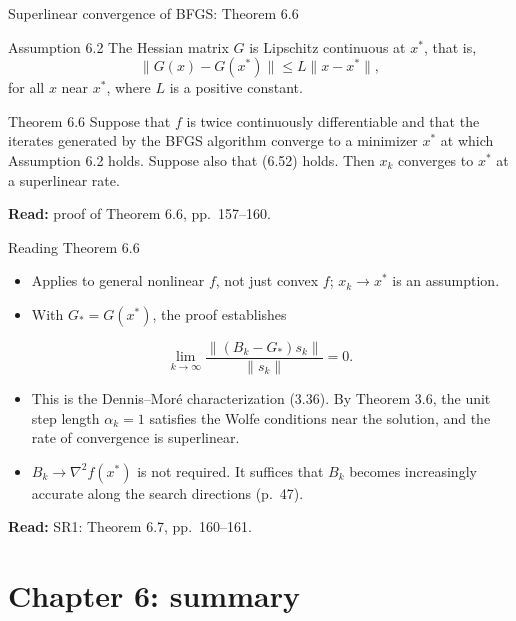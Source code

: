 \documentclass[aspectratio=169,12pt]{beamer}
\newcommand{\xs}{x^{*}}
\newcommand{\hessf}{\nabla^{2} f}
\newcommand{\readbook}[1]{{\color{red}\textbf{Read:} #1}}
\begin{document}
\begin{frame}{Superlinear convergence of BFGS: Theorem 6.6}
  \begin{block}{Assumption 6.2}
    The Hessian matrix $G$ is Lipschitz continuous at $\xs$, that is,
    \[ \|G(x)-G(\xs)\|\le L\|x-\xs\| , \]
    for all $x$ near $\xs$, where $L$ is a positive constant.
  \end{block}

  \begin{block}{Theorem 6.6}
    Suppose that $f$ is twice continuously differentiable and that the iterates generated by
    the BFGS algorithm converge to a minimizer $\xs$ at which Assumption 6.2 holds. Suppose
    also that (6.52) holds. Then $x_{k}$ converges to $\xs$ at a superlinear rate.
  \end{block}

  \readbook{proof of Theorem 6.6, pp.~157--160.}
\end{frame}

\begin{frame}{Reading Theorem 6.6}
  \begin{itemize}\setlength\itemsep{0.45em}
    \item Applies to general nonlinear $f$, not just convex $f$; $x_{k}\to\xs$ is an assumption.
    \item With $G_{*}=G(\xs)$, the proof establishes
  \end{itemize}
  \[ \lim_{k\to\infty}\frac{\|(B_{k}-G_{*})s_{k}\|}{\|s_{k}\|}=0 . \]
  \begin{itemize}\setlength\itemsep{0.45em}
    \item This is the Dennis--Mor\'e characterization (3.36). By Theorem 3.6, the unit step
      length $\alpha_{k}=1$ satisfies the Wolfe conditions near the solution, and the rate of
      convergence is superlinear.
    \item \alert{$B_{k}\to\hessf(\xs)$ is not required.} It suffices that $B_{k}$ becomes increasingly
      accurate along the search directions (p.~47).
  \end{itemize}
  \readbook{SR1: Theorem 6.7, pp.~160--161.}
\end{frame}

\section{Chapter 6: summary}
\end{document}
